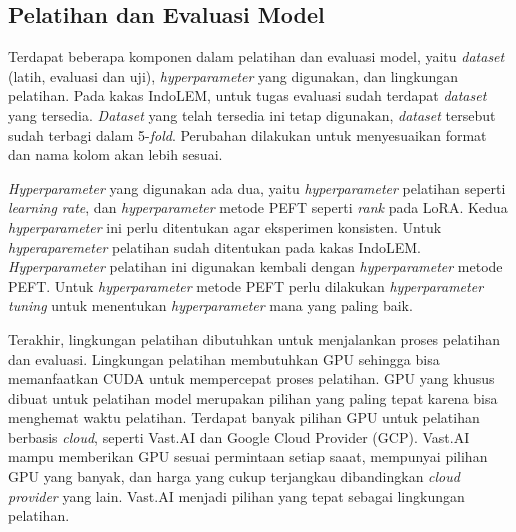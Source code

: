 \subsection{Pelatihan dan Evaluasi Model}

Terdapat beberapa komponen dalam pelatihan dan evaluasi model, yaitu \textit{dataset} (latih, evaluasi dan uji), \textit{hyperparameter} yang digunakan, dan lingkungan pelatihan. Pada kakas IndoLEM, untuk tugas evaluasi \nlptask sudah terdapat \textit{dataset} yang tersedia. \textit{Dataset} yang telah tersedia ini tetap digunakan, \textit{dataset} tersebut sudah terbagi dalam 5-\textit{fold}. Perubahan dilakukan untuk menyesuaikan format dan nama kolom akan lebih sesuai.

\textit{Hyperparameter} yang digunakan ada dua, yaitu \textit{hyperparameter} pelatihan seperti \textit{learning rate}, dan \textit{hyperparameter} metode PEFT seperti \textit{rank} pada LoRA. Kedua \textit{hyperparameter} ini perlu ditentukan agar eksperimen konsisten. Untuk \textit{hyperaparemeter} pelatihan sudah ditentukan pada kakas IndoLEM. \textit{Hyperparameter} pelatihan ini digunakan kembali dengan \textit{hyperparameter} metode PEFT. Untuk \textit{hyperparameter} metode PEFT perlu dilakukan \textit{hyperparameter tuning} untuk menentukan \textit{hyperparameter} mana yang paling baik.

Terakhir, lingkungan pelatihan dibutuhkan untuk menjalankan proses pelatihan dan evaluasi. Lingkungan pelatihan membutuhkan GPU sehingga bisa memanfaatkan CUDA untuk mempercepat proses pelatihan. GPU yang khusus dibuat untuk pelatihan model merupakan pilihan yang paling tepat karena bisa menghemat waktu pelatihan. Terdapat banyak pilihan GPU untuk pelatihan berbasis \textit{cloud}, seperti Vast.AI dan Google Cloud Provider (GCP). Vast.AI mampu memberikan GPU sesuai permintaan setiap saaat, mempunyai pilihan GPU yang banyak, dan harga yang cukup terjangkau dibandingkan \textit{cloud provider} yang lain. Vast.AI menjadi pilihan yang tepat sebagai lingkungan pelatihan.

